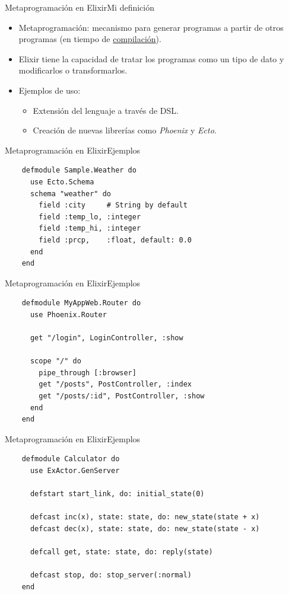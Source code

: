 \documentclass[14pt,aspectratio=169]{beamer}
\begin{document}
\begin{frame}{Metaprogramación en Elixir}{Mi definición}
  \begin{itemize}
    \item Metaprogramación: mecanismo para generar programas a partir de
    otros programas (en tiempo de \underline{compilación}).
    \item Elixir tiene la capacidad de tratar los programas como un tipo de dato
    y modificarlos o transformarlos.
    \item Ejemplos de uso:
      \begin{itemize}
        \item Extensión del lenguaje a través de DSL.
        \item Creación de nuevas librerías como \textit{Phoenix} y \textit{Ecto}.
      \end{itemize}
  \end{itemize}
\end{frame}

\begin{frame}[fragile]{Metaprogramación en Elixir}{Ejemplos}
  \begin{verbatim}
    defmodule Sample.Weather do
      use Ecto.Schema
      schema "weather" do
        field :city     # String by default
        field :temp_lo, :integer
        field :temp_hi, :integer
        field :prcp,    :float, default: 0.0
      end
    end
  \end{verbatim}
\end{frame}

\begin{frame}[fragile]{Metaprogramación en Elixir}{Ejemplos}
  \small\begin{verbatim}
    defmodule MyAppWeb.Router do
      use Phoenix.Router

      get "/login", LoginController, :show

      scope "/" do
        pipe_through [:browser]
        get "/posts", PostController, :index
        get "/posts/:id", PostController, :show
      end
    end
  \end{verbatim}
\end{frame}

\begin{frame}[fragile]{Metaprogramación en Elixir}{Ejemplos}
  \small\begin{verbatim}
    defmodule Calculator do
      use ExActor.GenServer

      defstart start_link, do: initial_state(0)

      defcast inc(x), state: state, do: new_state(state + x)
      defcast dec(x), state: state, do: new_state(state - x)

      defcall get, state: state, do: reply(state)

      defcast stop, do: stop_server(:normal)
    end
  \end{verbatim}
\end{frame}
\end{document}
